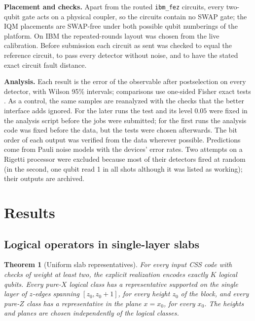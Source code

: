 \documentclass[10pt,a4paper,twocolumn]{article}
\newtheorem{theorem}{Theorem}
\begin{document}
\textbf{Placement and checks.}  Apart from the routed \texttt{ibm\_fez}
circuits, every two-qubit gate acts on a physical coupler, so the circuits
contain no SWAP gate; the IQM placements are SWAP-free under both possible qubit
numberings of the platform.  On IBM the repeated-rounds layout was chosen from
the live calibration.  Before submission each circuit as sent was checked to
equal the reference circuit, to pass every detector without noise, and to have
the stated exact circuit fault distance.

\textbf{Analysis.}  Each result is the error of the observable after
postselection on every detector, with Wilson 95\% intervals; comparisons use
one-sided Fisher exact tests \cite{Fisher}.  As a control, the same samples are
reanalyzed with the checks that the better interface adds ignored.  For the
later runs the test and its level $0.05$ were fixed in the analysis script
before the jobs were submitted; for the first runs the analysis code was fixed
before the data, but the tests were chosen afterwards.  The bit order of each
output was verified from the data wherever possible.  Predictions come from
Pauli noise models with the devices' error rates.  Two attempts on a Rigetti
processor were excluded because most of their detectors fired at random (in the
second, one qubit read 1 in all \hwStuck{} shots although it was listed as
working); their outputs are archived.

\section{Results}
\label{sec:results}
\subsection{Logical operators in single-layer slabs}
\label{sec:slabs}
\begin{theorem}[Uniform slab representatives]
\label{thm:slabs}
For every input CSS code with checks of weight at least two, the explicit
realization encodes exactly $K$ logical qubits.  Every pure-$X$ logical class
has a representative supported on the single layer of $z$-edges spanning
$[z_0,z_0+1]$, for every height $z_0$ of the block, and every pure-$Z$ class has
a representative in the plane $x=x_0$, for every $x_0$.  The heights and planes
are chosen independently of the logical classes.
\end{theorem}
\end{document}
